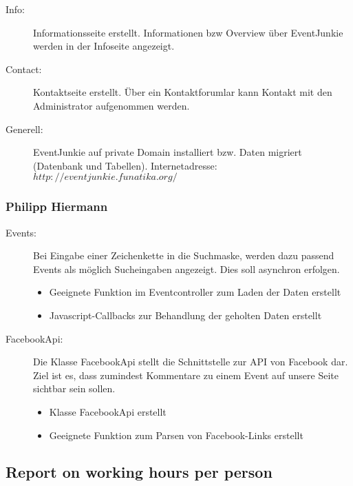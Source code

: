 \documentclass{article}
\begin{document}
\begin{description}
  \item[Info:]
  Informationsseite erstellt. Informationen bzw Overview über EventJunkie werden in der Infoseite angezeigt.
  
   \item[Contact:]
     Kontaktseite erstellt. Über ein Kontaktforumlar kann Kontakt mit den Administrator aufgenommen werden.

  \item[Generell:]
    EventJunkie auf private Domain installiert bzw. Daten migriert (Datenbank und Tabellen).
    Internetadresse: $http://eventjunkie.funatika.org/$

  
\end{description}


\subsubsection{Philipp Hiermann}

\begin{description}

    \item[Events:]
    Bei Eingabe einer Zeichenkette in die Suchmaske, werden dazu passend Events als möglich Sucheingaben angezeigt. Dies soll asynchron erfolgen.
      \begin{itemize}
        \item Geeignete Funktion im Eventcontroller zum Laden der Daten erstellt
        \item Javascript-Callbacks zur Behandlung der geholten Daten erstellt
      \end{itemize}
      
    \item[FacebookApi:]
    Die Klasse FacebookApi stellt die Schnittstelle zur API von Facebook dar. Ziel ist es, dass zumindest Kommentare zu einem Event auf unsere Seite sichtbar sein sollen.
    \begin{itemize}
        \item Klasse FacebookApi erstellt
        \item Geeignete Funktion zum Parsen von Facebook-Links erstellt

    \end{itemize}
    
\end{description}

\subsection{Report on working hours per person}
\end{document}
